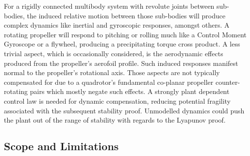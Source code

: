 \par
For a rigidly connected multibody system with revolute joints between sub-bodies, the induced relative motion between those sub-bodies will produce complex dynamics like inertial and gyroscopic responses, amongst others. A rotating propeller will respond to pitching or rolling much like a Control Moment Gyroscope \cite{cmg} or a flywheel, producing a precipitating torque cross product. A less trivial aspect, which is occasionally considered, is the aerodynamic effects produced from the propeller's aerofoil profile. Such induced responses manifest normal to the propeller's rotational axis. Those aspects are not typically compensated for due to a quadrotor's fundamental co-planar propeller counter-rotating pairs which mostly negate such effects. A strongly plant dependent control law is needed for dynamic compensation, reducing potential fragility associated with the subsequent stability proof. Unmodelled dynamics could push the plant out of the range of stability with regards to the Lyapunov proof. 
\subsection{Scope and Limitations}
\label{subsec:intro.foreword.scopeandlim}
